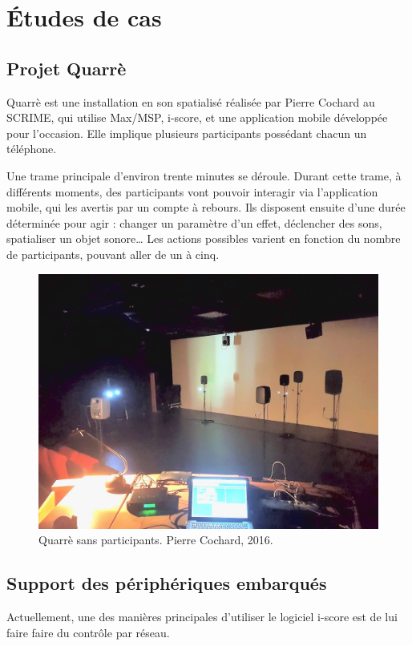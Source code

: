 \documentclass{article}
\begin{document}
\section{Études de cas}

\subsection{Projet Quarrè}
Quarrè est une installation en son spatialisé réalisée par Pierre Cochard au SCRIME, qui utilise Max/MSP, i-score, et une application mobile développée pour l'occasion. 
Elle implique plusieurs participants possédant chacun un téléphone.

Une trame principale d'environ trente minutes se déroule.
Durant cette trame, à différents moments, des participants vont pouvoir interagir via l'application mobile, qui les avertis par un compte à rebours. 
Ils disposent ensuite d'une durée déterminée pour agir : changer un paramètre d'un effet, déclencher des sons, spatialiser un objet sonore\dots
Les actions possibles varient en fonction du nombre de participants, pouvant aller de un à cinq.


\begin{figure}[h]
    \centering
    \includegraphics[scale=0.2]{images/quarre.jpg}
    \caption{Quarrè sans participants. Pierre Cochard, 2016.}
    \label{img.groupes}
\end{figure}

\subsection{Support des périphériques embarqués}
Actuellement, une des manières principales d'utiliser le logiciel i-score est de lui faire faire du contrôle par réseau. 
\end{document}
